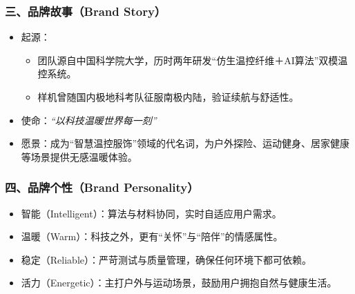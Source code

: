 \documentclass[UTF8]{report}
\theoremstyle{MyLineTheoremStyle} %
\theoremstyle{MyBlockTheoremStyle} %
\theoremstyle{MySubsubsectionStyle} %
\begin{document}
  \subsubsection{三、品牌故事（Brand Story）}
    \begin{itemize}
      \item 起源：  
        \begin{itemize}
          \item 团队源自中国科学院大学，历时两年研发“仿生温控纤维＋AI算法”双模温控系统。  
          \item 样机曾随国内极地科考队征服南极内陆，验证续航与舒适性。  
        \end{itemize}
      \item 使命：\emph{“以科技温暖世界每一刻”}  
      \item 愿景：成为“智慧温控服饰”领域的代名词，为户外探险、运动健身、居家健康等场景提供无感温暖体验。
    \end{itemize}

  \subsubsection{四、品牌个性（Brand Personality）}
    \begin{itemize}
      \item 智能（Intelligent）：算法与材料协同，实时自适应用户需求。  
      \item 温暖（Warm）：科技之外，更有“关怀”与“陪伴”的情感属性。  
      \item 稳定（Reliable）：严苛测试与质量管理，确保任何环境下都可依赖。  
      \item 活力（Energetic）：主打户外与运动场景，鼓励用户拥抱自然与健康生活。
    \end{itemize}
\end{document}
